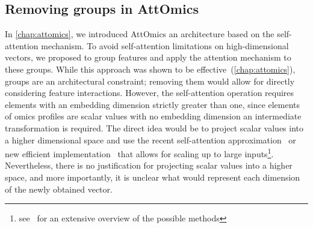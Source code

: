\documentclass[../main.tex]{subfiles}
\begin{document}
	\subsection{Removing groups in AttOmics}\label{sec:scalar_attention}
		In \cref{chap:attomics}, we introduced AttOmics an architecture based on the self-attention mechanism.
		To avoid self-attention limitations on high-dimensional vectors, we proposed to group features and apply the attention mechanism to these groups.
		While this approach was shown to be effective~(\cref{chap:attomics}), groups are an architectural constraint; removing them would allow for directly considering feature interactions.
		However, the self-attention operation requires elements with an embedding dimension strictly greater than one, since elements of omics profiles are scalar values with no embedding dimension an intermediate transformation is required.
		The direct idea would be to project scalar values into a higher dimensional space and use the recent self-attention approximation~\cite{xiongNystrOmformerNystr2021,Linformer} or new efficient implementation~\cite{FlashAttention,rabeSelfattentionDoesNot2021,bolyaHydraAttentionEfficient2022a} that allows for scaling up to large inputs\footnote{see~\cite{EfficientTransformers} for an extensive overview of the possible methods}.
		Nevertheless, there is no justification for projecting scalar values into a higher space, and more importantly, it is unclear what would represent each dimension of the newly obtained vector.
\end{document}
